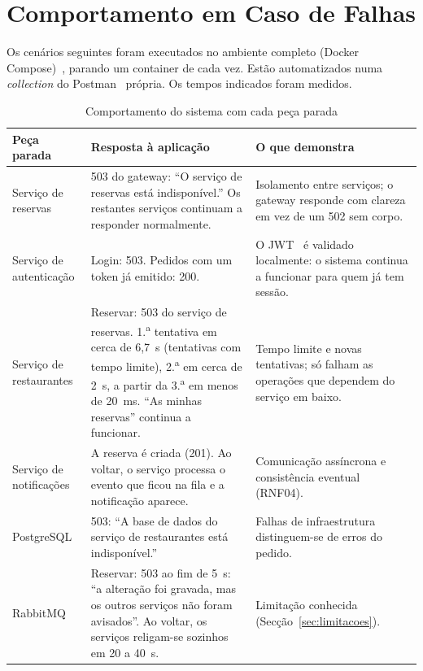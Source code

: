 \section{Comportamento em Caso de Falhas}

Os cenários seguintes foram executados no ambiente completo (Docker Compose)~\cite{compose}, parando um
container de cada vez. Estão automatizados numa \textit{collection} do Postman~\cite{postman} própria. Os tempos indicados foram medidos.

\begin{table}[H]
\centering
\small
\begin{tabularx}{\textwidth}{lXX}
\toprule
\textbf{Peça parada} & \textbf{Resposta à aplicação} & \textbf{O que demonstra} \\
\midrule
Serviço de reservas &
503 do gateway: ``O serviço de reservas está indisponível.'' Os restantes serviços continuam
a responder normalmente. &
Isolamento entre serviços; o gateway responde com clareza em vez de um 502 sem corpo. \\
\midrule
Serviço de autenticação &
Login: 503. Pedidos com um token já emitido: 200. &
O JWT~\cite{rfc7519} é validado localmente: o sistema continua a funcionar para quem já tem sessão. \\
\midrule
Serviço de restaurantes &
Reservar: 503 do serviço de reservas. 1.\textsuperscript{a} tentativa em cerca de 6,7~s
(tentativas com tempo limite), 2.\textsuperscript{a} em cerca de 2~s, a partir da
3.\textsuperscript{a} em menos de 20~ms. ``As minhas reservas'' continua a
funcionar. &
Tempo limite e novas tentativas; só falham as operações que dependem do serviço em
baixo. \\
\midrule
Serviço de notificações &
A reserva é criada (201). Ao voltar, o serviço processa o evento que ficou na fila e a
notificação aparece. &
Comunicação assíncrona e consistência eventual (RNF04). \\
\midrule
PostgreSQL &
503: ``A base de dados do serviço de restaurantes está indisponível.'' &
Falhas de infraestrutura distinguem-se de erros do pedido. \\
\midrule
RabbitMQ &
Reservar: 503 ao fim de 5~s: ``a alteração foi gravada, mas os outros serviços não foram
avisados''. Ao voltar, os serviços religam-se sozinhos em 20 a 40~s. &
Limitação conhecida (Secção~\ref{sec:limitacoes}). \\
\bottomrule
\end{tabularx}
\caption{Comportamento do sistema com cada peça parada}
\label{tab:falhas}
\end{table}

